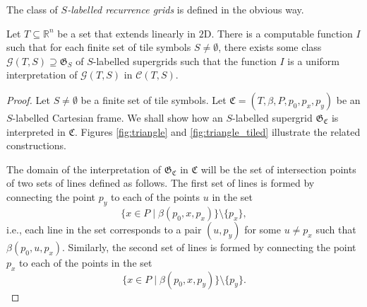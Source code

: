 \documentclass{LMCS}
\theoremstyle{plain}
\newcommand{\mf}{\mathfrak}
\begin{document}
The class of \emph{$S$-labelled recurrence grids} is defined in the obvious way.
%
%
%
\begin{lem}\label{gridinterpretablelemma}                                                                                                                                                                 
%
%
%
Let $T\subseteq\mathbb{R}^n$  be a set that extends linearly in $\mathrm{2D}$.
%
There is a computable function $I$ such that for each finite set of tile symbols $S\not=\emptyset$,
%
there exists some class
%
$\mathcal{G}(T,S)\supseteq \mf{G}_S$ of $S$-labelled supergrids such that 
%
the function $I$ is a uniform interpretation of
%
$\mathcal{G}(T,S)$ in $\mathcal{C}(T,S)$.
%
%
%
%
\end{lem}
%
%
%
\begin{proof}
%
%
%
Let $S\not=\emptyset$ be a finite set of tile symbols.
%
Let $\mf{C} = (T,\beta,P,p_0,p_x,p_y)$ be an $S$-labelled Cartesian frame.
%
We shall show how an $S$-labelled supergrid $\mf{G}_{\mf{C}}$ is interpreted in $\mf{C}$.
%
Figures \ref{fig:triangle} and \ref{fig:triangle_tiled} illustrate the related constructions.
%



%
The domain of the interpretation of $\mf{G}_{\mf{C}}$ in $\mf{C}$ will be the set of intersection
%
points of two sets of lines defined as follows.
%
The first set of lines 
%
is formed by connecting the point $p_y$ to each of the points $u$ in the set
%
%
%
$$\{x\in P\mid \beta(p_0,x,p_x)\}\setminus\{p_x\},$$
%
%
%
i.e., each line in the set corresponds to a pair $(u,p_y)$ for some $u\not=p_x$ such that $\beta(p_0,u,p_x)$.
%
Similarly, the second set of lines is formed by connecting the point $p_x$ to each of the points
%
in the set
%
%
%
$$\{x\in P\mid \beta(p_0,x,p_y)\}\setminus\{p_y\}.$$
%


\end{proof}
\end{document}
